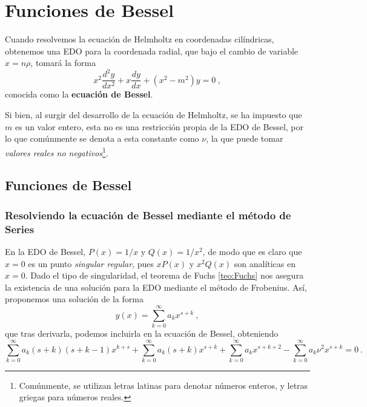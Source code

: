 \chapter{Funciones de Bessel}

Cuando resolvemos la ecuación de Helmholtz en coordenadas cilíndricas, obtenemos una EDO para la coordenada radial, que bajo el cambio de variable $x = n\rho$, tomará la forma
%
\begin{equation}\label{eq:EDO_Bessel}
    x^2 \frac{d^2y}{dx^2} + x \frac{dy}{dx} + (x^2 - m^2) y = 0 \ ,
\end{equation}
conocida como la \textbf{ecuación de Bessel}.

Si bien, al surgir del desarrollo de la ecuación de Helmholtz, se ha impuesto que $m$ es un valor entero, esta no es una restricción propia de la EDO de Bessel, por lo que comúnmente se denota a esta constante como $\nu$, la que puede tomar \emph{valores reales no negativos}\footnote{Comúnmente, se utilizan letras latinas para denotar números enteros, y letras griegas para números reales.}.

\section{Funciones de Bessel}

\subsection{Resolviendo la ecuación de Bessel mediante el método de Series}

En la EDO de Bessel, $P(x) = 1/x$ y $Q(x) = 1/x^2$, de modo que es claro que $x = 0$ es un punto \emph{singular regular}, pues $x P(x)$ y $x^2 Q(x)$ son analíticas en $x = 0$. Dado el tipo de singularidad, el teorema de Fuchs \ref{teo:Fuchs} nos asegura la existencia de una solución para la EDO mediante el método de Frobenius. Así, proponemos una solución de la forma
%
\begin{equation}\label{eq:solucion_serie_Bessel}
    y(x) = \sum_{k = 0}^\infty a_k x^{s+k} \ ,
\end{equation}
que tras derivarla, podemos incluirla en la ecuación de Bessel, obteniendo
\begin{equation}
    \sum_{k = 0}^\infty a_k (s + k)(s+ k - 1)x^{k + s} + \sum_{k = 0}^\infty a_k (s+k) x^{s+k} + \sum_{k = 0}^\infty a_{k} x^{s+k + 2} - \sum_{k = 0}^\infty a_k \nu^2 x^{s+k} = 0 \ .
\end{equation}

